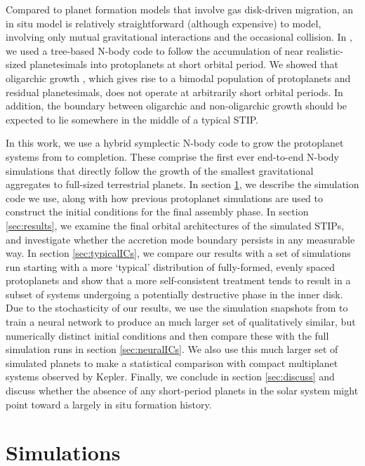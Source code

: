 Compared to planet formation models that involve gas disk-driven migration, an in situ model is relatively straightforward 
(although expensive) to model, involving only mutual gravitational interactions and the occasional collision. In \cite{wallace},
we used a tree-based N-body code to follow the accumulation of near realistic-sized planetesimals 
into protoplanets at short orbital period. We showed that oligarchic growth \cite{kokubo98}, which gives rise to a bimodal 
population of protoplanets and residual planetesimals, does not operate at arbitrarily short orbital periods. In addition, the 
boundary between oligarchic and non-oligarchic growth should be expected to lie somewhere in the middle of a typical STIP.

In this work, we use a hybrid symplectic N-body code to grow the protoplanet systems from \cite{wallace23} to completion. These 
comprise the first ever end-to-end N-body simulations that directly follow the growth of the 
smallest gravitational aggregates to full-sized terrestrial planets. In section \ref{sec:simulations}, we describe the simulation code 
we use, along with how previous protoplanet simulations are used to construct the initial conditions for the final assembly phase. In 
section \ref{sec:results}, we examine the final orbital architectures of the simulated STIPs, and investigate whether the accretion 
mode boundary persists in any measurable way. In section \ref{sec:typicalICs}, we compare our results with a set of simulations 
run starting with a more `typical' distribution of fully-formed, evenly spaced protoplanets and show that a more self-consistent 
treatment tends to result in a subset of systems undergoing a potentially destructive phase in the inner disk. Due to the 
stochasticity of our results, we use the simulation snapshots from \cite{wallace23} to train a neural 
network to produce an much larger set of qualitatively similar, but numerically distinct initial conditions and then compare these with the 
full simulation runs in section \ref{sec:neuralICs}. We also use this much larger set of simulated planets to make a statistical 
comparison with compact multiplanet systems observed by Kepler. Finally, we conclude in section \ref{sec:discuss} and discuss 
whether the absence of any short-period planets in the solar system might point toward a largely in situ formation history.

\section{Simulations} \label{sec:simulations}

